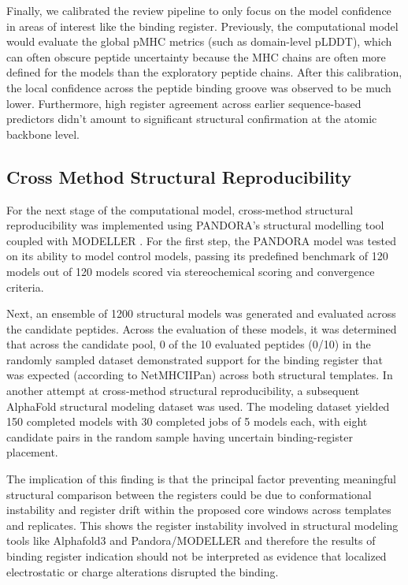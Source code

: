 \documentclass[11pt]{article}
\begin{document}
Finally, we calibrated the review pipeline to only focus on the model confidence in areas of interest like the binding register. Previously, the computational model would evaluate the global pMHC metrics (such as domain-level pLDDT), which can often obscure peptide uncertainty because the MHC chains are often more defined for the models than the exploratory peptide chains. After this calibration, the local confidence across the peptide binding groove was observed to be much lower. Furthermore, high register agreement across earlier sequence-based predictors didn’t amount to significant structural confirmation at the atomic backbone level.

\subsection{Cross Method Structural Reproducibility}
For the next stage of the computational model, cross-method structural reproducibility was implemented using PANDORA’s structural modelling tool coupled with MODELLER \cite{pandora,modeller}. For the first step, the PANDORA model was tested on its ability to model control models, passing its predefined benchmark of 120 models out of 120 models scored via stereochemical scoring and convergence criteria.

Next, an ensemble of 1200 structural models was generated and evaluated across the candidate peptides. Across the evaluation of these models, it was determined that across the candidate pool, 0 of the 10 evaluated peptides (0/10) in the randomly sampled dataset demonstrated support for the binding register that was expected (according to NetMHCIIPan) across both structural templates. In another attempt at cross-method structural reproducibility, a subsequent AlphaFold structural modeling dataset was used. The modeling dataset yielded 150 completed models with 30 completed jobs of 5 models each, with eight candidate pairs in the random sample having uncertain binding-register placement.

The implication of this finding is that the principal factor preventing meaningful structural comparison between the registers could be due to conformational instability and register drift within the proposed core windows across templates and replicates. This shows the register instability involved in structural modeling tools like Alphafold3 and Pandora/MODELLER and therefore the results of binding register indication should not be interpreted as evidence that localized electrostatic or charge alterations disrupted the binding.
\end{document}
